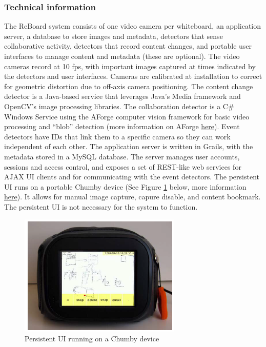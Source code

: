 \documentclass{article}
\begin{document}
	\subsubsection*{Technical information}
The ReBoard system consists of one video camera per whiteboard, an application server, a database to store images and metadata, detectors that sense collaborative activity, detectors that record content changes, and portable user interfaces to manage content and metadata (these are optional).  The video cameras record at 10 fps, with important images captured at times indicated by the detectors and user interfaces.  Cameras are calibrated at installation to correct for geometric distortion due to off-axis camera positioning.  The content change detector is a Java-based service that leverages Java's Media framework and OpenCV's image processing libraries.  The collaboration detector is a C\# Windows Service using the AForge computer vision framework for basic video processing and ``blob'' detection (more information on AForge \href{code.google.com/p/aforge/}{here}).  Event detectors have IDs that link them to a specific camera so they can work independent of each other.  The application server is written in Grails, with the metadata stored in a MySQL database.  The server manages user accounts, sessions and access control, and exposes a set of REST-like web services for AJAX UI clients and for communicating with the event detectors. The persistent UI runs on a portable Chumby device (See Figure \ref{fig:research_reboard_4} below, more information \href{http://en.wikipedia.org/wiki/Chumby}{here}).  It allows for manual image capture, capure disable, and content bookmark.  The persistent UI is not necessary for the system to function.

\begin{figure}[H]
\centering
\includegraphics[scale=1]{images/research_reboard_4}
\caption{Persistent UI running on a Chumby device}
\label{fig:research_reboard_4}
\end{figure}
\end{document}
